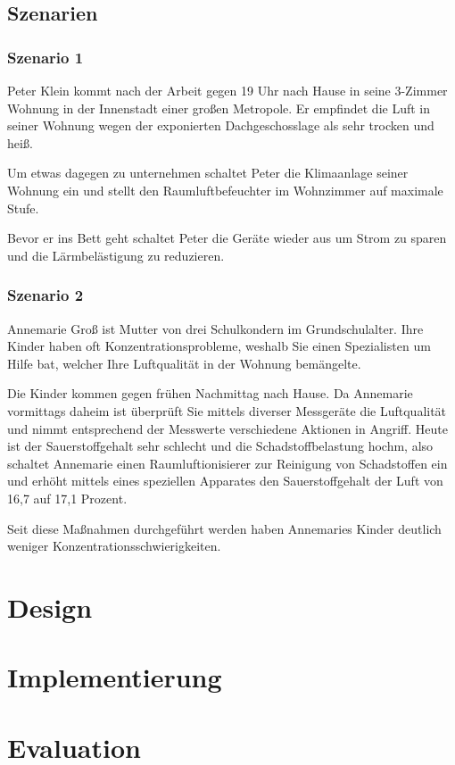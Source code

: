 \documentclass[a4paper,10pt]{article}
\begin{document}
\subsection{Szenarien}

\subsubsection{Szenario 1}
Peter Klein kommt nach der Arbeit gegen 19 Uhr nach Hause in seine 3-Zimmer Wohnung in der Innenstadt einer großen Metropole. Er empfindet die Luft in seiner Wohnung wegen der exponierten Dachgeschosslage als sehr trocken und heiß.

Um etwas dagegen zu unternehmen schaltet Peter die Klimaanlage seiner Wohnung ein und stellt den Raumluftbefeuchter im Wohnzimmer auf maximale Stufe.

Bevor er ins Bett geht schaltet Peter die Geräte wieder aus um Strom zu sparen und die Lärmbelästigung zu reduzieren.

\subsubsection{Szenario 2}
Annemarie Groß ist Mutter von drei Schulkondern im Grundschulalter. Ihre Kinder haben oft Konzentrationsprobleme, weshalb Sie einen Spezialisten um Hilfe bat, welcher Ihre Luftqualität in der Wohnung bemängelte.

Die Kinder kommen gegen frühen Nachmittag nach Hause. Da Annemarie vormittags daheim ist überprüft Sie mittels diverser Messgeräte die Luftqualität und nimmt entsprechend der Messwerte verschiedene Aktionen in Angriff. Heute ist der Sauerstoffgehalt sehr schlecht und die Schadstoffbelastung hochm, also schaltet Annemarie einen Raumluftionisierer zur Reinigung von Schadstoffen ein und erhöht mittels eines speziellen Apparates den Sauerstoffgehalt der Luft von 16,7 auf 17,1 Prozent.

Seit diese Maßnahmen durchgeführt werden haben Annemaries Kinder deutlich weniger Konzentrationsschwierigkeiten.

\section{Design}

\section{Implementierung}

\section{Evaluation}
\end{document}
